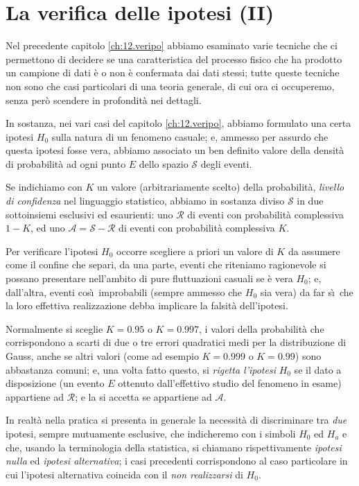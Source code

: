 
\chapter{La verifica delle ipotesi (II)}
Nel precedente capitolo \ref{ch:12.veripo} abbiamo esaminato
varie tecniche che ci permettono di decidere se una
caratteristica del processo fisico che ha prodotto un
campione di dati \`e o non \`e confermata dai dati stessi;
tutte queste tecniche non sono che casi particolari di una
teoria generale, di cui ora ci occuperemo, senza per\`o
scendere in profondit\`a nei dettagli.

In sostanza, nei vari casi del capitolo \ref{ch:12.veripo},
abbiamo formulato una certa ipotesi $H_0$ sulla natura di un
fenomeno casuale; e, ammesso per assurdo che questa ipotesi
fosse vera, abbiamo associato un ben definito valore della
densit\`a di probabilit\`a ad ogni punto $E$ dello spazio
$\mathcal{S}$ degli eventi.

Se indichiamo con $K$ un valore (arbitrariamente scelto)
della probabilit\`a, \emph{livello di confidenza} nel
linguaggio statistico, abbiamo in sostanza diviso
$\mathcal{S}$ in due sottoinsiemi esclusivi ed esaurienti:
uno $\mathcal{R}$ di eventi con probabilit\`a complessiva $1
- K$, ed uno $\mathcal{A} = \mathcal{S} - \mathcal{R}$ di
eventi con probabilit\`a complessiva $K$.

Per verificare l'ipotesi $H_0$ occorre scegliere a priori un
valore di $K$ da assumere come il confine che separi, da una
parte, eventi che riteniamo ragionevole si possano
presentare nell'ambito di pure fluttuazioni casuali se \`e
vera $H_0$; e, dall'altra, eventi cos\`\i\ improbabili
(sempre ammesso che $H_0$ sia vera) da far s\`\i\ che la
loro effettiva realizzazione debba implicare la falsit\`a
dell'ipotesi.

Normalmente si sceglie $K = 0.95$ o $K = 0.997$, i
valori della probabilit\`a che corrispondono a scarti di due
o tre errori quadratici medi per la distribuzione di Gauss,
anche se altri valori (come ad esempio $K = 0.999$ o
$K=0.99$) sono abbastanza comuni; e, una volta fatto
questo, si \emph{rigetta l'ipotesi} $H_0$ se il dato a
disposizione (un evento $E$ ottenuto dall'effettivo studio
del fenomeno in esame) appartiene ad $\mathcal{R}$; e la si
accetta se appartiene ad $\mathcal{A}$.

In realt\`a nella pratica si presenta in generale la
necessit\`a di discriminare tra \emph{due} ipotesi, sempre
mutuamente esclusive, che indicheremo con i simboli $H_0$ ed
$H_a$ e che, usando la terminologia della statistica, si
chiamano rispettivamente \emph{ipotesi nulla}%
ed \emph{ipotesi alternativa};%
i casi precedenti corrispondono al caso particolare in cui
l'ipotesi alternativa coincida con il \emph{non realizzarsi}
di $H_0$.

